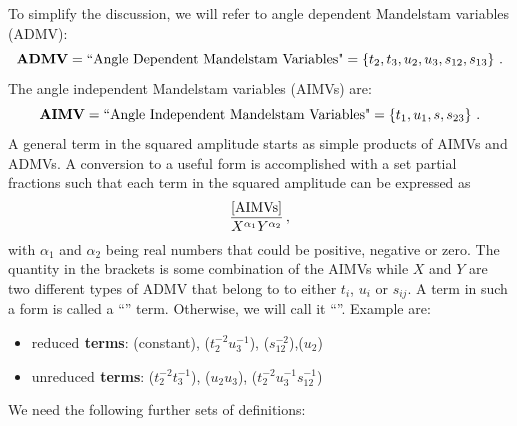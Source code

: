 \documentclass[prd,preprintnumbers,nofootinbib,superscriptaddress,onecolumn,preprint]{revtex4-1}
\newcommand\3[1]{\boldsymbol{#1}}
\newcommand{\proper}{\text{reduced}}
\newcommand{\improper}{\text{unreduced}}
\begin{document}
To simplify the discussion, we will refer to angle dependent
Mandelstam variables (ADMV): 
%
\begin{equation} 
\textbf{\text{ADMV}} = \text{``Angle Dependent Mandelstam Variables"} 
            = \left\{ t_2,t_3,u_2,u_3,s_{12},s_{13} \right\} \, .
\end{equation}
%
The angle independent Mandelstam variables (AIMVs) are: 
%
\begin{equation} 
\textbf{\text{AIMV}} = \text{``Angle Independent Mandelstam Variables"} 
            = \left\{ t_1,u_1,s,s_{23} \right\} \, .
\end{equation}
%
A general term in the squared amplitude starts as simple
products of AIMVs and ADMVs. A conversion to a useful form is
accomplished with a set partial fractions such that each term in the
squared amplitude can be expressed as 
%
\begin{equation} 
\frac{[{\rm AIMVs}]}{X^{\alpha_1}Y^{\alpha_2}} \, ,
\label{eq:ready}
\end{equation}
%
with $\alpha_1$ and $\alpha_2$ being real numbers that could be
positive, negative or zero.  The quantity in the brackets is some
combination of the AIMVs while  $X$ and $Y$ are two different types of
ADMV that belong to to either $t_i$, $u_i$ or $s_{ij}$. A term in such
a form is called a  ``\proper'' term.  Otherwise, we will call it
``\improper''. Example are:
%
\begin{itemize}
\item \textbf{$\proper$ terms}: (constant), ($t_2^{-2}u_3^{-1}$), ($s_{12}^{-2}$),($u_2$)
\item \textbf{$\improper$ terms}: ($t_2^{-2}t_3^{-1}$), ($u_2u_3$), 
                                     ($t_2^{-2}u_3^{-1}s_{12}^{-1}$)
\end{itemize}
%
We need the following further sets of definitions:
%
\end{document}
